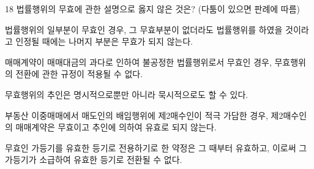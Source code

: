 \begin{question}{18}
법률행위의 무효에 관한 설명으로 옳지 않은 것은? (다툼이 있으면 판례에 따름)
\begin{choices}
  \item 법률행위의 일부분이 무효인 경우, 그 무효부분이 없더라도 법률행위를 하였을 것이라고 인정될 때에는 나머지 부분은 무효가 되지 않는다.
  \item 매매계약이 매매대금의 과다로 인하여 불공정한 법률행위로서 무효인 경우, 무효행위의 전환에 관한 규정이 적용될 수 없다.
  \item 무효행위의 추인은 명시적으로뿐만 아니라 묵시적으로도 할 수 있다.
  \item 부동산 이중매매에서 매도인의 배임행위에 제2매수인이 적극 가담한 경우, 제2매수인의 매매계약은 무효이고 추인에 의하여 유효로 되지 않는다.
  \item 무효인 가등기를 유효한 등기로 전용하기로 한 약정은 그 때부터 유효하고, 이로써 그 가등기가 소급하여 유효한 등기로 전환될 수 없다.
\end{choices}
\end{question}
